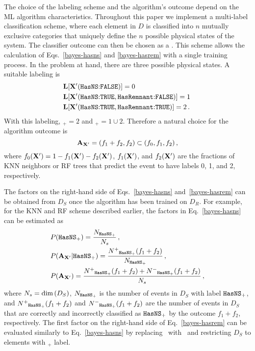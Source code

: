The choice of the labeling scheme and the algorithm's outcome depend on the \ac{ML} algorithm characteristics. Throughout this paper we implement a multi-label classification scheme,
where each element in $D$ is classified into $n$ mutually exclusive categories that uniquely define the $n$ possible physical states of the system. The classifier outcome can then be
chosen as a . This scheme allows the calculation of Eqs.~\eqref{bayes-hasns} and \eqref{bayes-hasrem} with a single
training process. In the problem at hand, there are three possible physical states. A suitable labeling is
%
\begin{align}
&{\bf L}[{\bf X}'(\hbox{{{\tt HasNS}}:{{\tt FALSE}}})]=0\,\nonumber\\
&{\bf L}[{\bf X}'(\hbox{{{\tt HasNS}}:{{\tt TRUE}}},\hbox{{{\tt HasRemnant}}:{{\tt FALSE}}})]=1\,\\
&{\bf L}[{\bf X}'(\hbox{{{\tt HasNS}}:{{\tt TRUE}}},\hbox{{{\tt HasRemnant}}:{{\tt TRUE}}})]=2\,.\nonumber
\end{align}
%
With this labeling, \hasrem$_+=2$ and \hasns$_+=1\cup 2$. Therefore a natural choice for the algorithm outcome is
%
\begin{equation}
{\bf A}_{\bf X'}=(f_1+f_2,f_2)\subset (f_0,f_1,f_2)\,,
\end{equation}
%
where $f_0({\bf X}')=1-f_1({\bf X}')-f_2({\bf X}')$, $f_1({\bf X}')$, and $f_2({\bf X}')$ are the fractions of \ac{KNN} neighbors or \ac{RF} trees that predict the event to
have labels 0, 1, and 2, respectively.

The factors on the right-hand side of Eqs.~\eqref{bayes-hasns} and~\eqref{bayes-hasrem} can be obtained from $D_{S}$ once the algorithm has been trained on $D_{R}$. For example, for the \ac{KNN} and \ac{RF} scheme described earlier, the factors in Eq.~\eqref{bayes-hasns} can be estimated as  
%
\begin{align}
&P({{\tt HasNS}}_+)=\frac{N_{{{\tt HasNS}}_+}}{N_s}\,,\nonumber\\
&P({\bf A}_{{\bf X}'}|{{\tt HasNS}}_+)=\frac{N^+{}_{{{\tt HasNS}}_+}(f_1+f_2)}{N_{{{\tt HasNS}}_+}}\,,\\
&P({\bf A}_{{\bf X}'})=\frac{N^+{}_{{{\tt HasNS}}_+}(f_1+f_2)+N^-{}_{{{\tt HasNS}}_+}(f_1+f_2)}{N_s}\,,\nonumber
\label{bayes-est}
\end{align}
%
where $N_s=\hbox{dim}\,(D_S)$, $N_{{{\tt HasNS}}_+}$ is the number of events in $D_S$ with label  ${{\tt HasNS}}_+$, and $N^+{}_{{{\tt HasNS}}_+}(f_1+f_2)$ and $N^-{}_{{{\tt HasNS}}_+}(f_1+f_2)$ are the number of
events in $D_S$ that are correctly and incorrectly classified as ${{{\tt HasNS}}_+}$ by the outcome $f_1+f_2$, respectively. The first factor on the right-hand side of Eq.~\eqref{bayes-hasrem}
can be evaluated similarly to Eq.~\eqref{bayes-hasns} by replacing \hasns\ with \hasrem\ and restricting $D_S$ to elements with \hasns$_+$ label.

